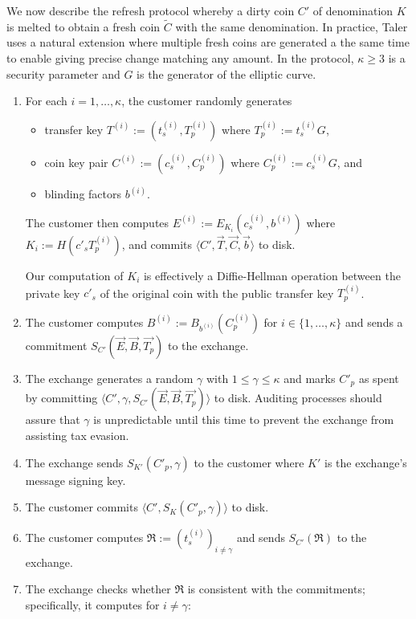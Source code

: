 \documentclass{llncs}
\begin{document}
We now describe the refresh protocol whereby a dirty coin $C'$ of
denomination $K$ is melted to obtain a fresh coin $\widetilde{C}$
with the same denomination.  In practice, Taler uses a natural
extension where multiple fresh coins are generated a the same time to
enable giving precise change matching any amount.
In the protocol, $\kappa \ge 3$ is a security parameter and $G$ is the
generator of the elliptic curve.

\begin{enumerate}
  \item For each $i = 1,\ldots,\kappa$, the customer randomly generates
    \begin{itemize}
      \item transfer key $T^{(i)} := \left(t^{(i)}_s,T^{(i)}_p\right)$
            where $T^{(i)}_p := t^{(i)}_s G$,
      \item coin key pair $C^{(i)} := \left(c_s^{(i)}, C_p^{(i)}\right)$
            where $C^{(i)}_p := c^{(i)}_s G$, and
      \item blinding factors $b^{(i)}$.
    \end{itemize}
    The customer then computes
      $E^{(i)} := E_{K_i}\left(c_s^{(i)}, b^{(i)}\right)$
    where $K_i := H(c'_s T_p^{(i)})$, and
    commits $\langle C', \vec{T}, \vec{C}, \vec{b} \rangle$ to disk.

    Our computation of $K_i$ is effectively a Diffie-Hellman operation
    between the private key $c'_s$ of the original coin with
    the public transfer key $T_p^{(i)}$.
  \item The customer computes $B^{(i)} := B_{b^{(i)}}(C^{(i)}_p)$  for $i \in \{1,\ldots,\kappa\}$ and sends a commitment
    $S_{C'}(\vec{E}, \vec{B}, \vec{T_p})$ to the exchange.
  \item The exchange generates a random $\gamma$ with $1 \le \gamma \le \kappa$ and
    marks $C'_p$ as spent by committing
    $\langle C', \gamma, S_{C'}(\vec{E}, \vec{B}, \vec{T_p}) \rangle$ to disk.
    Auditing processes should assure that $\gamma$ is unpredictable until
    this time to prevent the exchange from assisting tax evasion.
  \item The exchange sends $S_{K'}(C'_p, \gamma)$ to the customer where
    $K'$ is the exchange's message signing key.
  \item The customer commits $\langle C', S_K(C'_p, \gamma) \rangle$ to disk.
  \item The customer computes $\mathfrak{R} := \left(t_s^{(i)}\right)_{i \ne \gamma}$
        and sends $S_{C'}(\mathfrak{R})$ to the exchange.
  \item \label{step:refresh-ccheck} The exchange checks whether $\mathfrak{R}$ is consistent with the commitments;
    specifically, it computes for $i \not= \gamma$:


\end{enumerate}
\end{document}
